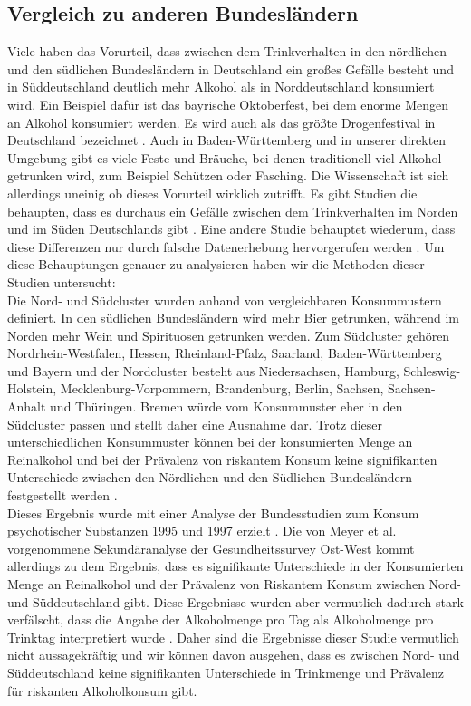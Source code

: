 \documentclass[12pt]{article}
\begin{document}
\subsection{Vergleich zu anderen Bundesländern}
Viele haben das Vorurteil, dass zwischen dem Trinkverhalten in den nördlichen und den südlichen Bundesländern in Deutschland ein großes Gefälle besteht und in Süddeutschland deutlich mehr Alkohol als in Norddeutschland konsumiert wird. Ein Beispiel dafür ist das bayrische Oktoberfest, bei dem enorme Mengen an Alkohol konsumiert werden. Es wird auch als das größte Drogenfestival in Deutschland bezeichnet \autocite{effern_munchen_2023}. Auch in Baden-Württemberg und in unserer direkten Umgebung gibt es viele Feste und Bräuche, bei denen traditionell viel Alkohol getrunken wird, zum Beispiel Schützen oder Fasching. Die Wissenschaft ist sich allerdings uneinig ob dieses Vorurteil wirklich zutrifft. Es gibt Studien die behaupten, dass es durchaus ein Gefälle zwischen dem Trinkverhalten im Norden und im Süden Deutschlands gibt \autocite{meyer_regionale_1998}. Eine andere Studie behauptet wiederum, dass diese Differenzen nur durch falsche Datenerhebung hervorgerufen werden \autocite[781]{kraus_einfluss_2001}. Um diese Behauptungen genauer zu analysieren haben wir die Methoden dieser Studien untersucht: \\
Die Nord- und Südcluster wurden anhand von vergleichbaren Konsummustern definiert. In den südlichen Bundesländern wird mehr Bier getrunken, während im Norden mehr Wein und Spirituosen getrunken werden. Zum Südcluster gehören Nordrhein-Westfalen, Hessen, Rheinland-Pfalz, Saarland, Baden-Württemberg und Bayern und der Nordcluster besteht aus Niedersachsen, Hamburg, Schleswig-Holstein, Mecklenburg-Vorpommern, Brandenburg, Berlin, Sachsen, Sachsen-Anhalt und Thüringen. Bremen würde vom Konsummuster eher in den Südcluster passen und stellt daher eine Ausnahme dar. Trotz dieser unterschiedlichen Konsummuster können bei der konsumierten Menge an Reinalkohol und bei der Prävalenz von riskantem Konsum keine signifikanten Unterschiede zwischen den Nördlichen und den Südlichen Bundesländern festgestellt werden \autocite[780]{kraus_einfluss_2001}.\\
Dieses Ergebnis wurde mit einer Analyse der Bundesstudien zum Konsum psychotischer Substanzen 1995 und 1997 erzielt \autocite[777]{kraus_einfluss_2001}. Die von Meyer et al. \autocite{meyer_regionale_1998} vorgenommene Sekundäranalyse der Gesundheitssurvey Ost-West kommt allerdings zu dem Ergebnis, dass es signifikante Unterschiede in der Konsumierten Menge an Reinalkohol und der Prävalenz von Riskantem Konsum zwischen Nord- und Süddeutschland gibt. Diese Ergebnisse wurden aber vermutlich dadurch stark verfälscht, dass die Angabe der Alkoholmenge pro Tag als Alkoholmenge pro Trinktag interpretiert wurde \autocite[781]{kraus_einfluss_2001}. Daher sind die Ergebnisse dieser Studie vermutlich nicht aussagekräftig und wir können davon ausgehen, dass es zwischen Nord- und Süddeutschland keine signifikanten Unterschiede in Trinkmenge und Prävalenz für riskanten Alkoholkonsum gibt.\\
\end{document}
